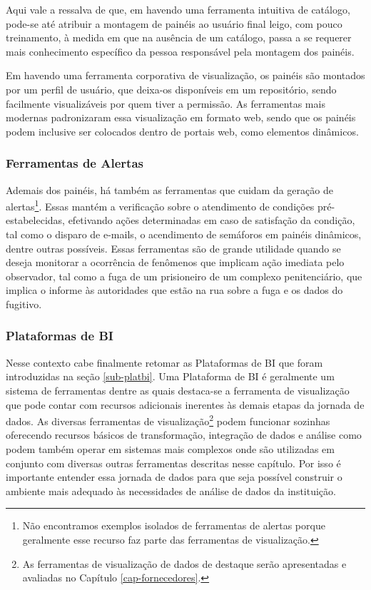     Aqui vale a ressalva de que, em havendo uma ferramenta intuitiva de catálogo, pode-se até atribuir a montagem de painéis ao usuário final leigo, com pouco treinamento, à medida em que na ausência de um catálogo, passa a se requerer mais conhecimento específico da pessoa responsável pela montagem dos painéis.

    Em havendo uma ferramenta corporativa de visualização, os painéis são montados por um perfil de usuário, que deixa-os disponíveis em um repositório, sendo facilmente visualizáveis por quem tiver a permissão. As ferramentas mais modernas padronizaram essa visualização em formato web, sendo que os painéis podem inclusive ser colocados dentro de portais web, como elementos dinâmicos.

    \subsubsection*{Ferramentas de Alertas}

    Ademais dos painéis, há também as ferramentas que cuidam da geração de alertas\footnote{Não encontramos exemplos isolados de ferramentas de alertas porque geralmente esse recurso faz parte das ferramentas de visualização.}. Essas mantém a verificação sobre o atendimento de condições pré-estabelecidas, efetivando ações determinadas em caso de satisfação da condição, tal como o disparo de e-mails, o acendimento de semáforos em painéis dinâmicos, dentre outras possíveis. Essas ferramentas são de grande utilidade quando se deseja monitorar a ocorrência de fenômenos que implicam ação imediata pelo observador, tal como a fuga de um prisioneiro de um complexo penitenciário, que implica o informe às autoridades que estão na rua sobre a fuga e os dados do fugitivo. 

    \subsubsection*{Plataformas de BI}
    
    Nesse contexto cabe finalmente retomar as Plataformas de BI que foram introduzidas na seção \ref{sub-platbi}. Uma Plataforma de BI é geralmente um sistema de ferramentas dentre as quais destaca-se a ferramenta de visualização que pode contar com recursos adicionais inerentes às demais etapas da jornada de dados. As diversas ferramentas de visualização\footnote{As ferramentas de visualização de dados de destaque serão apresentadas e avaliadas no Capítulo \ref{cap-fornecedores}.} podem funcionar sozinhas oferecendo recursos básicos de transformação, integração de dados e análise como podem também operar em sistemas mais complexos onde são utilizadas em conjunto com diversas outras ferramentas descritas nesse capítulo. Por isso é importante entender essa jornada de dados para que seja possível construir o ambiente mais adequado às necessidades de análise de dados da instituição.

